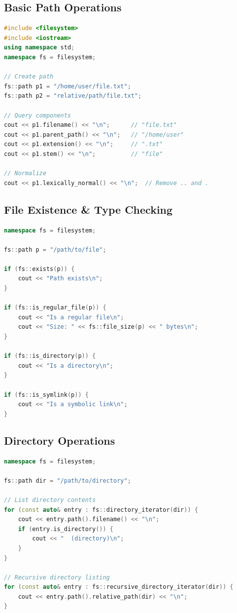 \hypertarget{basic-path-operations}{%
\subsection{Basic Path Operations}\label{basic-path-operations}}

\begin{lstlisting}[language={C++}]
#include <filesystem>
#include <iostream>
using namespace std;
namespace fs = filesystem;

// Create path
fs::path p1 = "/home/user/file.txt";
fs::path p2 = "relative/path/file.txt";

// Query components
cout << p1.filename() << "\n";      // "file.txt"
cout << p1.parent_path() << "\n";   // "/home/user"
cout << p1.extension() << "\n";     // ".txt"
cout << p1.stem() << "\n";          // "file"

// Normalize
cout << p1.lexically_normal() << "\n";  // Remove .. and .
\end{lstlisting}

\hypertarget{file-existence-type-checking}{%
\subsection{File Existence \& Type
Checking}\label{file-existence-type-checking}}

\begin{lstlisting}[language={C++}]
namespace fs = filesystem;

fs::path p = "/path/to/file";

if (fs::exists(p)) {
    cout << "Path exists\n";
}

if (fs::is_regular_file(p)) {
    cout << "Is a regular file\n";
    cout << "Size: " << fs::file_size(p) << " bytes\n";
}

if (fs::is_directory(p)) {
    cout << "Is a directory\n";
}

if (fs::is_symlink(p)) {
    cout << "Is a symbolic link\n";
}
\end{lstlisting}

\hypertarget{directory-operations}{%
\subsection{Directory Operations}\label{directory-operations}}

\begin{lstlisting}[language={C++}]
namespace fs = filesystem;

fs::path dir = "/path/to/directory";

// List directory contents
for (const auto& entry : fs::directory_iterator(dir)) {
    cout << entry.path().filename() << "\n";
    if (entry.is_directory()) {
        cout << "  (directory)\n";
    }
}

// Recursive directory listing
for (const auto& entry : fs::recursive_directory_iterator(dir)) {
    cout << entry.path().relative_path(dir) << "\n";
}
\end{lstlisting}

